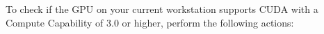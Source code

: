 \documentclass[12pt]{article}
\begin{document}
To check if the GPU on your current workstation supports CUDA with a Compute Capability of 3.0 or higher, perform the following actions:\\

\end{document}
